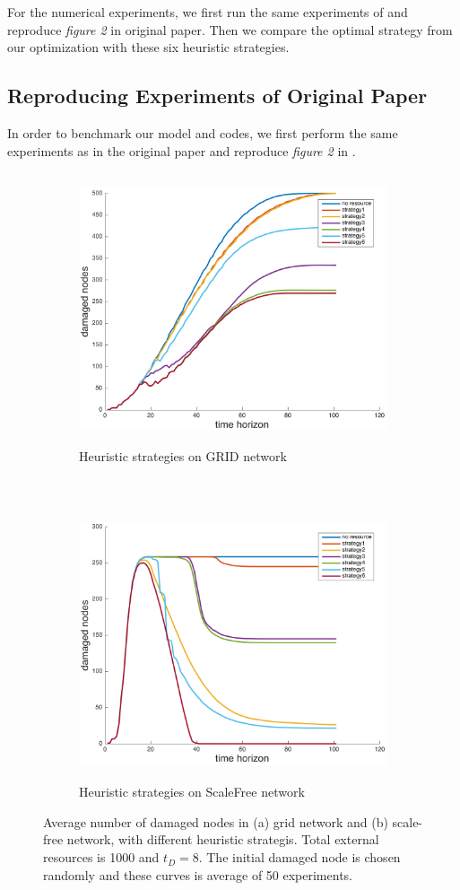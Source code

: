 For the numerical experiments, we first run the same experiments of \cite{buzna2007efficient} and reproduce \emph{figure 2} in original paper\cite{buzna2007efficient}. Then we compare the optimal strategy from our optimization with these six heuristic strategies.

\subsection{Reproducing Experiments of Original Paper}

In order to benchmark our model and codes, we first perform the same experiments as in the original paper\cite{buzna2007efficient} and reproduce \emph{figure 2} in \cite{buzna2007efficient}.


\begin{figure}	
	\centering
	\begin{subfigure}[t]{0.8\textwidth}
		\centering
		\includegraphics[height=80mm]{../figs/GridNet_original_paper2.pdf}
		\caption{Heuristic strategies on GRID network}
	\end{subfigure}
	~
	\begin{subfigure}[t]{0.8\textwidth}
		\centering
		\includegraphics[height=80mm]{../figs/SFNet_original_paper2.pdf}
		\caption{Heuristic strategies on ScaleFree network}
	\end{subfigure}
	\caption{Average number of damaged nodes in (a) grid network and (b) scale-free network, with different heuristic strategis. Total external resources is 1000 and $t_D=8$. The initial damaged node is chosen randomly and these curves is average of 50 experiments.}
	\label{fig:reproduceresult}
\end{figure}
